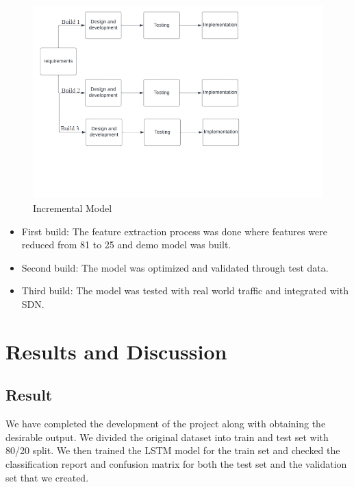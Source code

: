 \begin{figure}[tbh] %
	\begin{center}
		\includegraphics[width=6in]{images/sdlc1.png} 
		\caption{Incremental Model} %
		\label{Incremental Model} %
	\end{center}
\end{figure}
\newpage
\begin{itemize}
	\item First build: The feature extraction process was done where features were reduced from 81 to 25 and demo model was built.
	\item Second build: The model was optimized and validated through test data.
	\item Third build: The model was tested with real world traffic and integrated with SDN.
\end{itemize}
\chapter{Results and Discussion}
\vspace{-18pt}
\section{Result}
\vspace{-18pt}
We have completed the development of the project along with obtaining the desirable output. We divided the original dataset into train and test set with 80/20 split. We then trained the LSTM model for the train set and checked the classification report and confusion matrix for both the test set and the validation set that we created.


